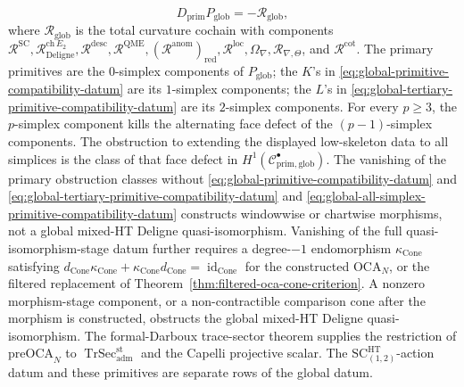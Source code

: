 \begin{defn}
  \[
    D_{\mathrm{prim}}P_{\mathrm{glob}}=-\mathcal R_{\mathrm{glob}},
  \]
	  where \(\mathcal R_{\mathrm{glob}}\) is the total curvature cochain
	  with components
  \(\mathcal R^{\mathrm{SC}},
  \mathcal R^{\mathrm{ch}\,E_2}_{\mathrm{Deligne}},
  \mathcal R^{\mathrm{desc}},
  \mathcal R^{\mathrm{QME}},
  (\mathcal R^{\mathrm{anom}})_{\mathrm{red}},
  \mathcal R^{\mathrm{loc}},\Omega_\nabla,\mathcal R_{\nabla,\Theta}\),
  and \(\mathcal R^{\mathrm{cot}}\).  The primary primitives are the
  \(0\)-simplex components of \(P_{\mathrm{glob}}\); the \(K\)'s in
  \eqref{eq:global-primitive-compatibility-datum} are its \(1\)-simplex
  components; the \(L\)'s in
  \eqref{eq:global-tertiary-primitive-compatibility-datum} are its
  \(2\)-simplex components.  For every \(p\geq3\), the \(p\)-simplex
  component kills the alternating face defect of the \((p-1)\)-simplex
  components.  The obstruction to extending the displayed low-skeleton
  data to all simplices is the class of that face defect in
  \(H^1(\mathcal C^\bullet_{\mathrm{prim,glob}})\).
  The vanishing of the primary obstruction classes without
  \eqref{eq:global-primitive-compatibility-datum} and
  \eqref{eq:global-tertiary-primitive-compatibility-datum} and
  \eqref{eq:global-all-simplex-primitive-compatibility-datum} constructs
  windowwise or chartwise morphisms, not a global mixed-HT Deligne
  quasi-isomorphism.
  Vanishing of the full quasi-isomorphism-stage datum further requires
  a degree-\(-1\) endomorphism \(\kappa_{\operatorname{Cone}}\) satisfying
  \(d_{\operatorname{Cone}}\kappa_{\operatorname{Cone}}+
  \kappa_{\operatorname{Cone}}d_{\operatorname{Cone}}=
  \operatorname{id}_{\operatorname{Cone}}\) for the constructed
  \(\mathrm{OCA}_N\), or the filtered replacement of
  Theorem~\ref{thm:filtered-oca-cone-criterion}.  A nonzero
  morphism-stage component, or a non-contractible comparison cone after
  the morphism is constructed, obstructs the global mixed-HT Deligne
  quasi-isomorphism.  The formal-Darboux trace-sector theorem supplies
  the restriction of \(\mathrm{preOCA}_N\) to
  \(\operatorname{TrSec}^{\mathrm{st}}_{\mathrm{adm}}\) and the Capelli
  projective scalar.  The
  \(\mathrm{SC}^{\mathrm{HT}}_{(1,2)}\)-action datum and these
  primitives are separate rows of the global datum.
\end{defn}

